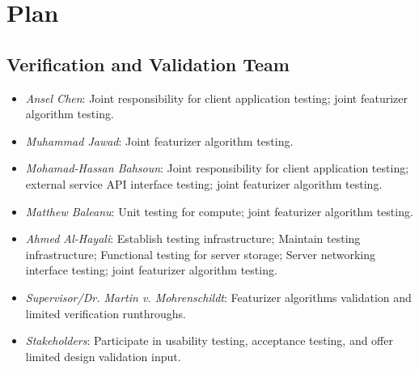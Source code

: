 \documentclass[12pt, titlepage]{article}
\begin{document}
\section{Plan}


\subsection{Verification and Validation Team}

\begin{itemize}
  \item \emph{Ansel Chen}: Joint responsibility for client application testing; joint featurizer algorithm testing.
  \item \emph{Muhammad Jawad}: Joint featurizer algorithm testing.
  \item \emph{Mohamad-Hassan Bahsoun}: Joint responsibility for client application testing; external service API interface testing; joint featurizer algorithm testing.
  \item \emph{Matthew Baleanu}: Unit testing for compute; joint featurizer algorithm testing.
  \item \emph{Ahmed Al-Hayali}: Establish testing infrastructure; Maintain testing infrastructure; Functional testing for server storage; Server networking interface testing; joint featurizer algorithm testing.
  \item \emph{Supervisor/Dr. Martin v. Mohrenschildt}: Featurizer algorithms validation and limited verification runthroughs.
  \item \emph{Stakeholders}: Participate in usability testing, acceptance testing, and offer limited design validation input.
\end{itemize}
\end{document}
